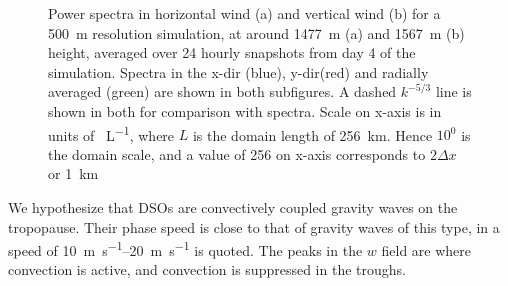 \documentclass[11pt,a4paper]{article}
\begin{document}
\begin{figure}[htb!]%
    \centering
    \qquad
    \caption{Power spectra in horizontal wind (a) and vertical wind (b) for a \SI{500}{m} resolution simulation, at around \SI{1477}{m} (a) and \SI{1567}{m} (b) height, averaged over 24 hourly snapshots from day 4 of the simulation. Spectra in the x-dir (blue), y-dir(red) and radially averaged (green) are shown in both subfigures. A dashed $k^{-5/3}$ line is shown in both for comparison with spectra. Scale on x-axis is in units of \SI{}{L^{-1}}, where $L$ is the domain length of \SI{256}{km}. Hence $10^0$ is the domain scale, and a value of 256 on x-axis corresponds to $2 \Delta x$ or \SI{1}{km}}%
    \label{fig:power_spectra}%
\end{figure}

We hypothesize that DSOs are convectively coupled gravity waves on the tropopause. Their phase speed is close to that of gravity waves of this type, in \cite{gill1982atmosphere} a speed of \SIrange[range-phrase=--, range-units=single]{10}{20}{m.s^{-1}} is quoted. The peaks in the $w$ field are where convection is active, and convection is suppressed in the troughs. 
\end{document}
